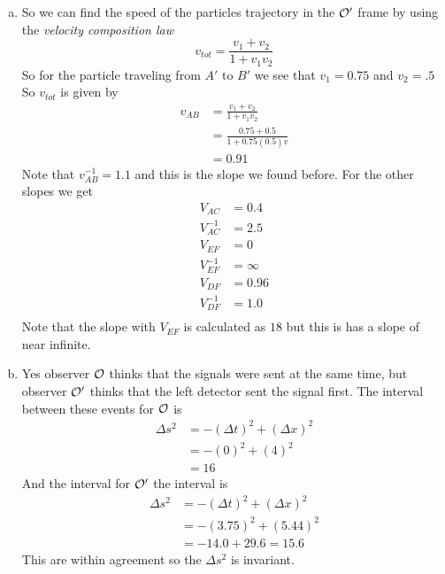 \documentclass[11pt]{article}
\numberwithin{equation}{section}
\begin{document}
\begin{enumerate}[(a)]
\item
So we can find the speed of the particles trajectory in the $\mathcal{O}'$ frame by using the \emph{velocity composition law}
$$v_{tot} = \frac{v_1+v_2}{1+v_1v_2}$$
So for the particle traveling from $A'$ to $B'$ we see that $v_1 = 0.75$ and $v_2 = .5$
So $v_{tot}$ is given by
\begin{align*}
v_{AB} &= \frac{v_1+v_2}{1+v_1v_2}\\
&= \frac{0.75+0.5}{1+0.75(0.5)v}\\
&= 0.91
\end{align*}
Note that $v_{AB}^{-1} = 1.1$ and this is the slope we found before. For the other slopes we get
\begin{align*}
V_{AC} &= 0.4\\
V_{AC}^{-1} &= 2.5\\
V_{EF} &= 0\\
V_{EF}^{-1} &= \infty\\
V_{DF} &= 0.96\\
V_{DF}^{-1} &= 1.0\\
\end{align*}
Note that the slope with $V_{EF}$ is calculated as $18$ but this is has a slope of near infinite.

\item
Yes observer $\mathcal{O}$ thinks that the signals were sent at the same time, but observer $\mathcal{O}'$ thinks that the left detector sent the signal first. The interval between these events for $\mathcal{O}$ is
\begin{align*}
\Delta s^2 &= -(\Delta t)^2 + (\Delta x)^2\\
&= -(0)^2 + (4)^2\\
&= 16
\end{align*}
And the interval for $\mathcal{O}'$ the interval is
\begin{align*}
\Delta s^2 &= -(\Delta t)^2 + (\Delta x)^2\\
&= -(3.75)^2 + (5.44)^2\\
&= -14.0 + 29.6 = 15.6
\end{align*}
This are within agreement so the $\Delta s^2$ is invariant.

\end{enumerate}
\end{document}
